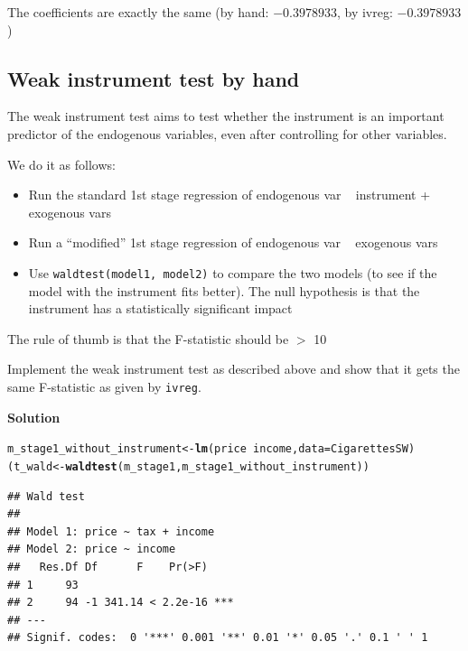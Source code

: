 \documentclass{article}\usepackage[]{graphicx}\usepackage[]{color}
\makeatletter
\newcommand{\hlopt}[1]{\textcolor[rgb]{0,0,0}{#1}}%
\newcommand{\hlstd}[1]{\textcolor[rgb]{0.345,0.345,0.345}{#1}}%
\newcommand{\hlkwb}[1]{\textcolor[rgb]{0.69,0.353,0.396}{#1}}%
\newcommand{\hlkwc}[1]{\textcolor[rgb]{0.333,0.667,0.333}{#1}}%
\newcommand{\hlkwd}[1]{\textcolor[rgb]{0.737,0.353,0.396}{\textbf{#1}}}%
\newenvironment{kframe}{%
 \def\at@end@of@kframe{}%
 \ifinner\ifhmode%
  \def\at@end@of@kframe{\end{minipage}}%
  \begin{minipage}{\columnwidth}%
 \fi\fi%
 \def\FrameCommand##1{\hskip\@totalleftmargin \hskip-\fboxsep
 \colorbox{shadecolor}{##1}\hskip-\fboxsep
     \hskip-\linewidth \hskip-\@totalleftmargin \hskip\columnwidth}%
 \MakeFramed {\advance\hsize-\width
   \@totalleftmargin\z@ \linewidth\hsize
   \@setminipage}}%
 {\par\unskip\endMakeFramed%
 \at@end@of@kframe}
\newenvironment{knitrout}{}{} %
\makeatother
\begin{document}
The coefficients are exactly the same (by hand: \ensuremath{-0.3978933}, by ivreg: \ensuremath{-0.3978933})

\subsection{Weak instrument test by hand}

The weak instrument test aims to test whether the instrument is an important predictor of the endogenous variables, even after controlling for other variables.

We do it as follows:

\begin{itemize}
\item Run the standard 1st stage regression of endogenous var ~ instrument + exogenous vars
\item Run a ``modified'' 1st stage regression of endogenous var ~ exogenous vars
\item Use \verb`waldtest(model1, model2)` to compare the two models (to see if the model with the instrument fits better). The null hypothesis is that the instrument has a statistically significant impact
\end{itemize}
The rule of thumb is that the F-statistic should be $>$ 10

Implement the weak instrument test as described above and show that it gets the same F-statistic as given by \verb`ivreg`.

\textbf{Solution}

\begin{knitrout}
\color{fgcolor}\begin{kframe}
\begin{alltt}
\hlstd{m_stage1_without_instrument} \hlkwb{<-} \hlkwd{lm}\hlstd{(price} \hlopt{~} \hlstd{income,} \hlkwc{data} \hlstd{= CigarettesSW)}
\hlstd{(t_wald} \hlkwb{<-} \hlkwd{waldtest}\hlstd{(m_stage1, m_stage1_without_instrument))}
\end{alltt}
\begin{verbatim}
## Wald test
## 
## Model 1: price ~ tax + income
## Model 2: price ~ income
##   Res.Df Df      F    Pr(>F)    
## 1     93                        
## 2     94 -1 341.14 < 2.2e-16 ***
## ---
## Signif. codes:  0 '***' 0.001 '**' 0.01 '*' 0.05 '.' 0.1 ' ' 1
\end{verbatim}
\end{kframe}
\end{knitrout}
\end{document}
